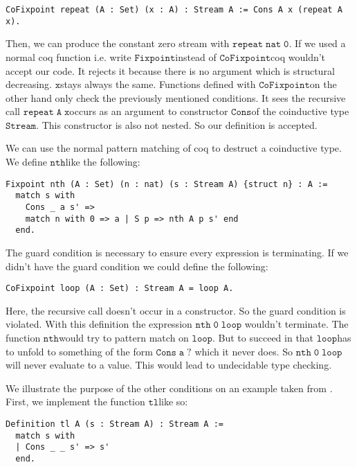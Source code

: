 \documentclass[a4paper,cleardoubleempty,BCOR1cm]{scrbook}
\begin{document}
\begin{verbatim}
CoFixpoint repeat (A : Set) (x : A) : Stream A := Cons A x (repeat A x).
\end{verbatim}

Then, we can produce the constant zero stream with $\mathtt{repeat\;nat\;0}$. If we used
a normal coq function i.e. write $\mathtt{Fixpoint}$\;instead of $\mathtt{CoFixpoint}$\;coq
wouldn't accept our code. It rejects it because there is no argument which is
structural decreasing. $\mathtt{x}$\;stays always the same. Functions defined with
$\mathtt{CoFixpoint}$\;on the other hand only check the previously mentioned
conditions. It sees the recursive call $\mathtt{repeat\;A\;x}$\;occurs as an argument to
constructor $\mathtt{Cons}$\;of the coinductive type $\mathtt{Stream}$. This constructor is also
not nested. So our definition is accepted.

We can use the normal pattern matching of coq to destruct a coinductive type.
We define $\mathtt{nth}$\;like the following:

\begin{verbatim}
Fixpoint nth (A : Set) (n : nat) (s : Stream A) {struct n} : A :=
  match s with
    Cons _ a s' =>
    match n with 0 => a | S p => nth A p s' end
  end.
\end{verbatim}

The guard condition is necessary to ensure every expression is terminating.
If we didn't have the guard condition we could define the following:

\begin{verbatim}
CoFixpoint loop (A : Set) : Stream A = loop A.
\end{verbatim}

Here, the recursive call doesn't occur in a constructor. So the guard
condition is violated. With this definition the expression $\mathtt{nth\;0\;loop}$
wouldn't terminate. The function $\mathtt{nth}$\;would try to pattern match on $\mathtt{loop}$. But to
succeed in that $\mathtt{loop}$\;has to unfold to something of the form $\mathtt{Cons\;a\;?}$
which it never does. So $\mathtt{nth\;0\;loop}$\;will never evaluate to a value. This
would lead to undecidable type checking.

We illustrate the purpose of the other conditions on an example taken from
\cite{chlipala2013certified}.  First, we implement the function $\mathtt{tl}$\;like so:

\begin{verbatim}
Definition tl A (s : Stream A) : Stream A :=
  match s with
  | Cons _ _ s' => s'
  end.
\end{verbatim}
\end{document}

